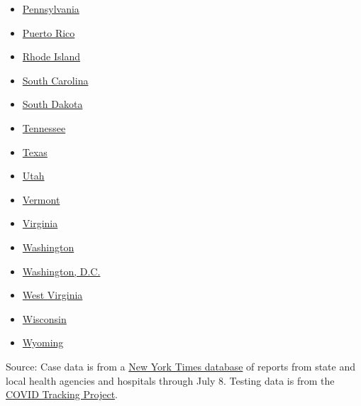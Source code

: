 \begin{itemize}
\item
  \href{https://www.nytimes.com/interactive/2020/us/pennsylvania-coronavirus-cases.html}{Pennsylvania}
\item
  \href{https://www.nytimes.com/interactive/2020/us/puerto-rico-coronavirus-cases.html}{Puerto
  Rico}
\item
  \href{https://www.nytimes.com/interactive/2020/us/rhode-island-coronavirus-cases.html}{Rhode
  Island}
\item
  \href{https://www.nytimes.com/interactive/2020/us/south-carolina-coronavirus-cases.html}{South
  Carolina}
\item
  \href{https://www.nytimes.com/interactive/2020/us/south-dakota-coronavirus-cases.html}{South
  Dakota}
\item
  \href{https://www.nytimes.com/interactive/2020/us/tennessee-coronavirus-cases.html}{Tennessee}
\item
  \href{https://www.nytimes.com/interactive/2020/us/texas-coronavirus-cases.html}{Texas}
\item
  \href{https://www.nytimes.com/interactive/2020/us/utah-coronavirus-cases.html}{Utah}
\item
  \href{https://www.nytimes.com/interactive/2020/us/vermont-coronavirus-cases.html}{Vermont}
\item
  \href{https://www.nytimes.com/interactive/2020/us/virginia-coronavirus-cases.html}{Virginia}
\item
  \href{https://www.nytimes.com/interactive/2020/us/washington-coronavirus-cases.html}{Washington}
\item
  \href{https://www.nytimes.com/interactive/2020/us/washington-dc-coronavirus-cases.html}{Washington,
  D.C.}
\item
  \href{https://www.nytimes.com/interactive/2020/us/west-virginia-coronavirus-cases.html}{West
  Virginia}
\item
  \href{https://www.nytimes.com/interactive/2020/us/wisconsin-coronavirus-cases.html}{Wisconsin}
\item
  \href{https://www.nytimes.com/interactive/2020/us/wyoming-coronavirus-cases.html}{Wyoming}
\end{itemize}

Source: Case data is from a
\href{https://www.nytimes.com/interactive/2020/us/coronavirus-us-cases.html}{New
York Times database} of reports from state and local health agencies and
hospitals through July 8. Testing data is from the
\href{https://covidtracking.com/}{COVID Tracking Project}.


